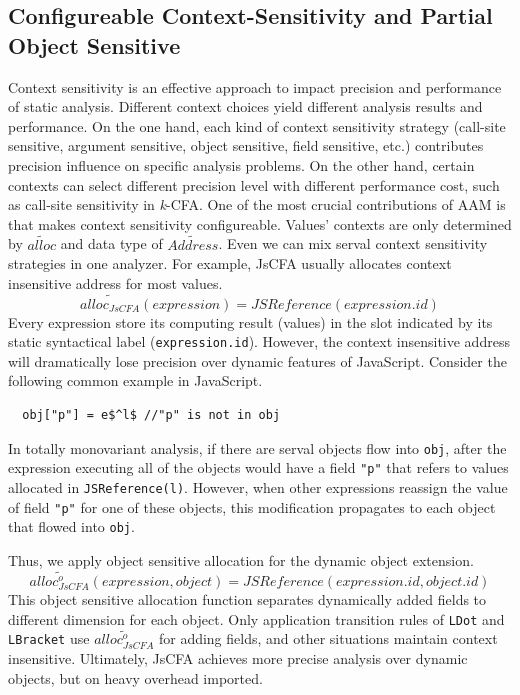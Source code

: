 \documentclass{article}
\begin{document}
\subsection{Configureable Context-Sensitivity and Partial Object Sensitive}
\label{sub:Configureable}
Context sensitivity is an effective approach to impact precision and performance of static analysis. Different context choices yield different analysis results and performance. On the one hand, each kind of context sensitivity strategy (call-site sensitive, argument sensitive, object sensitive, field sensitive, etc.) contributes precision influence on specific analysis problems. On the other hand, certain contexts can select different precision level with different performance cost, such as call-site sensitivity in \textit{k}-CFA\@.
One of the most crucial contributions of AAM is that makes context sensitivity configureable. Values' contexts are only determined by $\widetilde{alloc}$ and data type of $\widetilde{Address}$. %
Even we can mix serval context sensitivity strategies in one analyzer. For example, JsCFA usually allocates context insensitive address for most values.
\[
\widetilde{alloc_{JsCFA}}(expression) = JSReference(expression.id)
\]
Every expression store its computing result (values) in the slot indicated by its static syntactical label (\verb|expression.id|). However, the context insensitive address will dramatically lose precision over dynamic features of JavaScript. Consider the following common example in JavaScript.
\lstset{mathescape}
\begin{lstlisting}
  obj["p"] = e$^l$ //"p" is not in obj
\end{lstlisting}
In totally monovariant analysis, if there are serval objects flow into \verb|obj|, after the expression executing all of the objects would have a field \verb|"p"| that refers to values allocated in \verb|JSReference(l)|. However, when other expressions reassign the value of field \verb|"p"| for one of these objects, this modification propagates to each object that flowed into \verb|obj|.

Thus, we apply object sensitive allocation for the dynamic object extension.
\[
\widetilde{alloc^{o}_{JsCFA}}(expression, object) = JSReference(expression.id, object.id)
\]
This object sensitive allocation function separates dynamically added fields to different dimension for each object. Only application transition rules of \verb|LDot| and \verb|LBracket| use $\widetilde{alloc^{o}_{JsCFA}}$ for adding fields, and other situations maintain context insensitive. Ultimately, JsCFA achieves more precise analysis over dynamic objects, but on heavy overhead imported.
\end{document}
